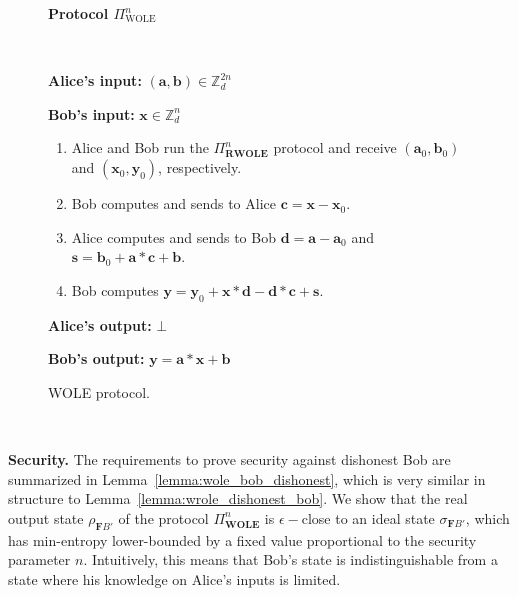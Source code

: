 \begin{figure}[h!]
    \centering
        \begin{tcolorbox}
            
            \centerline{\textbf{Protocol $\Pi^n_{\text{WOLE}}$}}
            
            \
            
    \textbf{Alice's input:} $(\bm{a}, \bm{b})\in \mathbb{Z}^{2n}_d$ 
    
    \textbf{Bob's input:} $\bm{x}\in \mathbb{Z}^{n}_d$

    \begin{enumerate}
        \item Alice and Bob run the $\Pi^n_{\textbf{RWOLE}}$ protocol and receive  $(\bm{a}_0, \bm{b}_0)$ and $(\bm{x}_0, \bm{y}_0)$, respectively.
        \item Bob computes and sends to Alice $\bm{c} = \bm{x} - \bm{x}_0$.
        \item Alice computes and  sends to Bob $\bm{d} = \bm{a} - \bm{a}_0$ and $\bm{s} = \bm{b}_0 + \bm{a} * \bm{c} + \bm{b}$. 
        \item Bob computes $\bm{y} = \bm{y}_0 + \bm{x} * \bm{d} - \bm{d} * \bm{c} + \bm{s}$.
    \end{enumerate}
    

\textbf{Alice's output:} $\bot$

\textbf{Bob's output:} $\bm{y} = \bm{a} * \bm{x} + \bm{b}$
        
        \end{tcolorbox}
\caption{WOLE protocol.}
\label{fig:nOLE}
\end{figure}


\

\noindent\textbf{Security.}  The requirements to prove security against dishonest Bob are summarized in Lemma~\ref{lemma:wole_bob_dishonest}, which is very similar in structure to Lemma~\ref{lemma:wrole_dishonest_bob}. We show that the real output state $\rho_{\mathbf{F} B'}$ of the protocol $\Pi^n_{\textbf{WOLE}}$ is $\epsilon-$close to an ideal state $\sigma_{\mathbf{F} B'}$, which has min-entropy lower-bounded by a fixed value proportional to the security parameter $n$. Intuitively, this means that Bob's state is indistinguishable from a state where his knowledge on Alice's inputs is limited.

